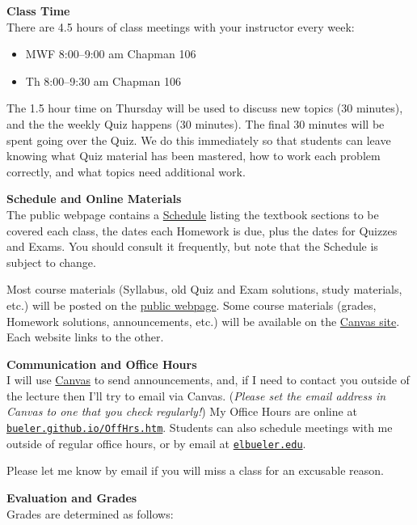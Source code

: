 \documentclass[12pt]{article}
\renewcommand{\emph}[1]{\textsf{\textbf{#1}}}
\newcommand{\localhead}[1]{\par\smallskip\textbf{#1} \smallskip\nobreak\\}%
\def\heading#1{\localhead{\large\emph{#1}}}
\begin{document}
\heading{Class Time}
There are 4.5 hours of class meetings with your instructor every week:
\begin{itemize}
\item MWF 8:00--9:00 am  Chapman 106
\item Th 8:00--9:30 am  Chapman 106
\end{itemize}

The 1.5 hour time on Thursday will be used to discuss new topics (30 minutes), and the the weekly Quiz happens (30 minutes).  The final 30 minutes will be spent going over the Quiz.  We do this immediately so that students can leave knowing what Quiz material has been mastered, how to work each problem correctly, and what topics need additional work.


\heading{Schedule and Online Materials}
The public webpage contains a \href{https://bueler.github.io/calc3/assets/general/schedule.pdf}{Schedule} listing the textbook sections to be covered each class, the dates each Homework is due, plus the dates for Quizzes and Exams.  You should consult it frequently, but note that the Schedule is subject to change.

Most course materials (Syllabus, old Quiz and Exam solutions, study materials, etc.) will be posted on the \href{https://bueler.github.io/calc3/}{public webpage}.  Some course materials (grades, Homework solutions, announcements, etc.) will be available on the \href{https://canvas.alaska.edu/courses/13188}{Canvas site}.  Each website links to the other.


\heading{Communication and Office Hours}
I will use \href{https://canvas.alaska.edu/courses/13188}{Canvas} to send announcements, and, if I need to contact you outside of the lecture then I'll try to email via Canvas.  (\textsl{Please set the email address in Canvas to one that you check regularly!})  My Office Hours are online at \href{http://bueler.github.io/OffHrs.htm}{\texttt{bueler.github.io/OffHrs.htm}}.  Students can also schedule meetings with me outside of regular office hours, or by email at \href{mailto:elbueler@alaska.edu}{\texttt{elbueler\@@alaska.edu}}.

Please let me know by email if you will miss a class for an excusable reason.



\heading{Evaluation and Grades}
Grades are determined as follows:
 
\end{document}
